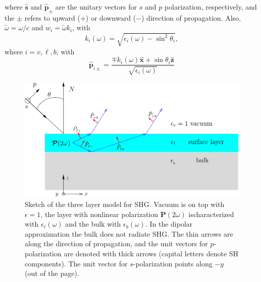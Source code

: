\documentclass[10pt]{article}
\begin{document}
where $\hat{\mathbf{s}}$ and $\hat{\mathbf{p}}_\pm$ are the unitary vectors for
$s$ and $p$ polarization, respectively, and the $\pm$ refers to upward ($+$) or
downward ($-$) direction of propagation. Also, $\tilde\omega=\omega/c$ and
$w_i=\tilde\omega k_i$, with
\begin{equation*}\label{r3}
k_i(\omega)=\sqrt{\epsilon_i(\omega) - \sin^2\theta_i},
\end{equation*}
where $i=v,\ell,b$, with
\begin{equation*}\label{r4}
\hat{\mathbf{p}}_{i\pm} =
\frac{\mp k_i(\omega)\hat{\mathbf{x}} + \sin\theta_i\hat{\mathbf{z}}}
{\sqrt{\epsilon_i(\omega)}}
\end{equation*}
\begin{figure}[t]
\centering
\includegraphics[scale=.5]{figures/3layers}
\caption{Sketch of the three layer model for SHG. Vacuum is on top with
$\epsilon=1$, the layer with nonlinear polarization $\mathbf{P}(2\omega)$
ischaracterized with $\epsilon_{\ell}(\omega)$ and the bulk with
$\epsilon_{b}(\omega)$. In the dipolar approximation the bulk does not radiate
SHG. The thin arrows are along the direction of propagation, and the unit
vectors for $p$-polarization are denoted with thick arrows (capital letters
denote SH components). The unit vector for $s$-polarization points along $-y$
(out of the page).}
\label{3layer}
\end{figure}
\end{document}
